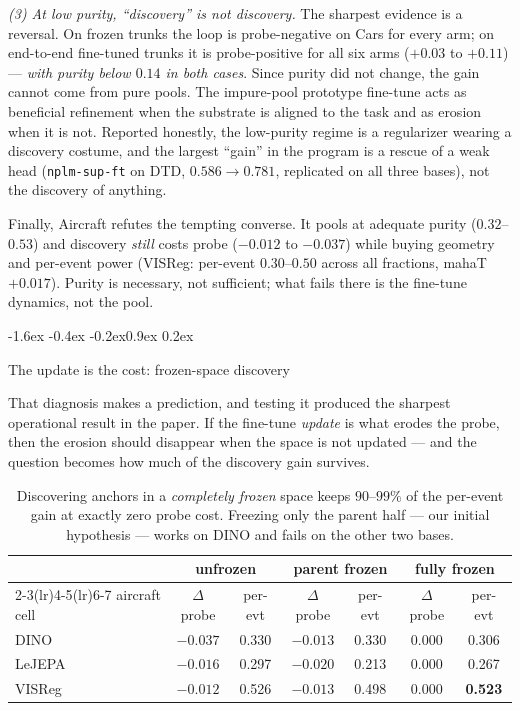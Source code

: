 \documentclass{article}
\makeatletter
\renewcommand\subsection{\@startsection{subsection}{2}{\z@}%
  {-1.6ex \@plus -0.4ex \@minus -0.2ex}{0.9ex \@plus 0.2ex}%
  {\normalsize\bf\raggedright}}
\newcommand{\best}[1]{\textbf{#1}}
\makeatother
\begin{document}
\emph{(3) At low purity, ``discovery'' is not discovery.} The sharpest
evidence is a reversal. On frozen trunks the loop is probe-negative on Cars for
every arm; on end-to-end fine-tuned trunks it is probe-positive for all six
arms ($+0.03$ to $+0.11$) --- \emph{with purity below $0.14$ in both cases}.
Since purity did not change, the gain cannot come from pure pools. The
impure-pool prototype fine-tune acts as beneficial refinement when the
substrate is aligned to the task and as erosion when it is not. Reported
honestly, the low-purity regime is a regularizer wearing a discovery costume,
and the largest ``gain'' in the program is a rescue of a weak head
(\texttt{nplm-sup-ft} on DTD, $0.586\to0.781$, replicated on all three bases),
not the discovery of anything.

Finally, Aircraft refutes the tempting converse. It pools at adequate purity
($0.32$--$0.53$) and discovery \emph{still} costs probe ($-0.012$ to $-0.037$)
while buying geometry and per-event power (VISReg: per-event $0.30$--$0.50$
across all fractions, mahaT $+0.017$). Purity is necessary, not sufficient;
what fails there is the fine-tune dynamics, not the pool.

\subsection{The update is the cost: frozen-space discovery}
\label{sec:frozen}

That diagnosis makes a prediction, and testing it produced the sharpest
operational result in the paper. If the fine-tune \emph{update} is what erodes
the probe, then the erosion should disappear when the space is not updated ---
and the question becomes how much of the discovery gain survives.

\begin{table}[t]\centering\small
\begin{tabular}{lcccccc}
\toprule
& \multicolumn{2}{c}{unfrozen} & \multicolumn{2}{c}{parent frozen}
& \multicolumn{2}{c}{\textbf{fully frozen}}\\
\cmidrule(lr){2-3}\cmidrule(lr){4-5}\cmidrule(lr){6-7}
aircraft cell & $\Delta$probe & per-evt & $\Delta$probe & per-evt
& $\Delta$probe & per-evt \\
\midrule
DINO   & $-0.037$ & 0.330 & $-0.013$ & 0.330 & $\mathbf{0.000}$ & 0.306 \\
LeJEPA & $-0.016$ & 0.297 & $-0.020$ & 0.213 & $\mathbf{0.000}$ & 0.267 \\
VISReg & $-0.012$ & 0.526 & $-0.013$ & 0.498 & $\mathbf{0.000}$ & \best{0.523} \\
\bottomrule
\end{tabular}
\caption{Discovering anchors in a \emph{completely frozen} space keeps
$90$--$99\%$ of the per-event gain at exactly zero probe cost. Freezing only
the parent half --- our initial hypothesis --- works on DINO and fails on the
other two bases.}
\label{tab:frozen}
\end{table}
\end{document}
